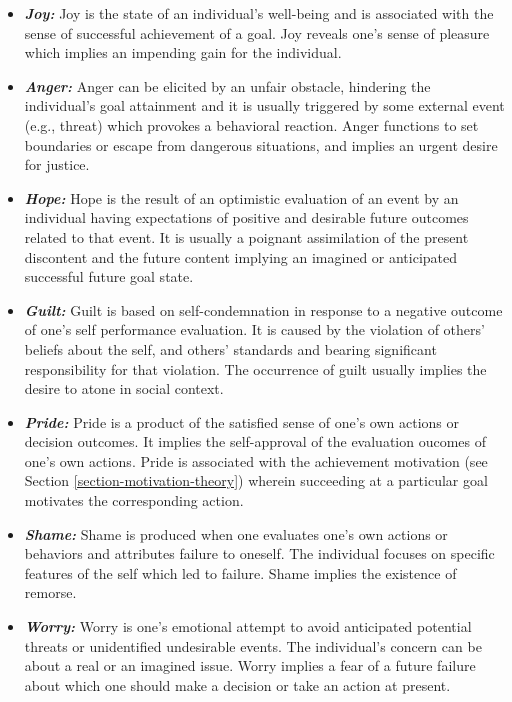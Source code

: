 \documentclass[12pt]{report}
\begin{document}
\begin{itemize}
  \item \textbf{\textit{Joy:}} Joy is the state of an individual's well-being
  and is associated with the sense of successful achievement of a goal. Joy
  reveals one's sense of pleasure which implies an impending gain for the
  individual.
  
  \item \textbf{\textit{Anger:}} Anger can be elicited by an unfair obstacle,
  hindering the individual's goal attainment and it is usually triggered by some
  external event (e.g., threat) which provokes a behavioral reaction. Anger
  functions to set boundaries or escape from dangerous situations, and implies
  an urgent desire for justice.
  
  \item \textbf{\textit{Hope:}} Hope is the result of an optimistic evaluation
  of an event by an individual having expectations of positive and desirable
  future outcomes related to that event. It is usually a poignant assimilation
  of the present discontent and the future content implying an imagined or
  anticipated successful future goal state.
  
  \item \textbf{\textit{Guilt:}} Guilt is based on self-condemnation in response
  to a negative outcome of one's self performance evaluation. It is caused by
  the violation of others' beliefs about the self, and others' standards and
  bearing significant responsibility for that violation. The occurrence of
  guilt usually implies the desire to atone in social context.
  
  \item \textbf{\textit{Pride:}} Pride is a product of the satisfied sense of
  one's own actions or decision outcomes. It implies the self-approval of the
  evaluation oucomes of one's own actions. Pride is associated with the
  achievement motivation (see Section \ref{section-motivation-theory}) wherein
  succeeding at a particular goal motivates the corresponding action.
  
  \item \textbf{\textit{Shame:}} Shame is produced when one evaluates one's own
  actions or behaviors and attributes failure to oneself. The individual focuses
  on specific features of the self which led to failure. Shame implies the
  existence of remorse.
  
  \item \textbf{\textit{Worry:}} Worry is one's emotional attempt to avoid
  anticipated potential threats or unidentified undesirable events. The
  individual's concern can be about a real or an imagined issue. Worry implies a
  fear of a future failure about which one should make a decision or take an
  action at present.
  
\end{itemize}
\end{document}
